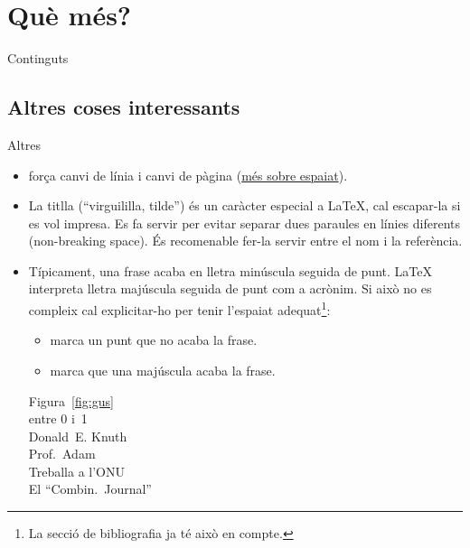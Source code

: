 \section{Què més?}\label{sec:altres}
\begin{frame}{Continguts}
\begin{multicols}{2}
\tableofcontents[currentsection]
\end{multicols}
\end{frame}

\subsection{Altres coses interessants}
\begin{frame}[fragile]{Altres}
\begin{itemize}\small
    \item \cmdbs{\textbackslash} força canvi de línia i  canvi de pàgina (\href{https://www.overleaf.com/learn/latex/Line_breaks_and_blank_spaces#Line_breaks}{més sobre espaiat}).
    \item La titlla (``virguililla, tilde'') \keystroke{\~} és un caràcter especial a \LaTeX{}, cal escapar-la si es vol impresa. Es fa servir per evitar separar dues paraules en línies diferents (non-breaking space). És recomenable fer-la servir entre el nom i la referència.
    \item Típicament, una frase acaba en lletra minúscula seguida de punt. \LaTeX{} interpreta lletra majúscula seguida de punt com a acrònim. Si això no es compleix cal explicitar-ho per tenir l'espaiat adequat\footnote{La secció de bibliografia ja té això en compte.}:
    \begin{itemize}
        \item {} marca un punt que no acaba la frase.
        \item {} marca que una majúscula acaba la frase.
    \end{itemize}

\begin{exampletwouptiny}
Figura~\ref{fig:gus} \\
entre 0 i~1 \\
Donald~E. Knuth \\
Prof.~Adam\\
Treballa a l'ONU\@ \\
El ``Combin.\ Journal''
\end{exampletwouptiny}
\end{itemize}
\end{frame}

